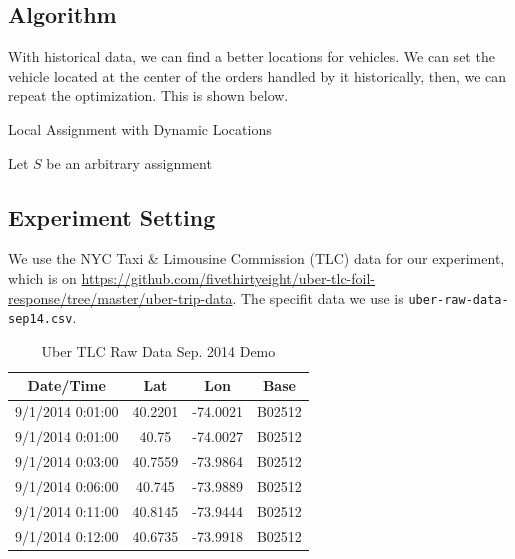 \documentclass{llncs}
\begin{document}
\subsection{Algorithm}
With historical data, we can find a better locations for vehicles. We can set the vehicle located at the center of the orders handled by it historically, then, we can repeat the optimization. This is shown below.
\begin{minipage}[t]{0.8\textwidth}
\begin{algorithm}[H]
	\BlankLine
	\caption{Local Assignment with Dynamic Locations}\label{Alg_Local_Assignment_2}
	\BlankLine
	 
	Let $S$ be an arbitrary assignment\;
	
	
	\;
	
\end{algorithm}
\end{minipage}

\subsection{Experiment Setting}
We use the NYC Taxi & Limousine Commission (TLC) data for our experiment, which is on \url{https://github.com/fivethirtyeight/uber-tlc-foil-response/tree/master/uber-trip-data}. The specifit data we use is \texttt{uber-raw-data-sep14.csv}.
\begin{table}[H]
  \centering
  \caption{Uber TLC Raw Data Sep. 2014 Demo}
    \begin{tabular}{cccc}
    \toprule
    Date/Time & Lat   & Lon   & Base \\
    \midrule
    \phantom{2333} 9/1/2014 0:01:00 \phantom{2333} & \phantom{2333} 40.2201 \phantom{2333}& \phantom{2333} -74.0021 \phantom{2333} & \phantom{2333} B02512 \phantom{2333} \\
    9/1/2014 0:01:00 & 40.75 & -74.0027 & B02512 \\
    9/1/2014 0:03:00 & 40.7559 & -73.9864 & B02512 \\
    9/1/2014 0:06:00 & 40.745 & -73.9889 & B02512 \\
    9/1/2014 0:11:00 & 40.8145 & -73.9444 & B02512 \\
    9/1/2014 0:12:00 & 40.6735 & -73.9918 & B02512 \\
    \bottomrule
    \end{tabular}%
  \label{tab:Uber TLC Raw Data Sep. 2014 Demo}%
\end{table}%
\end{document}
